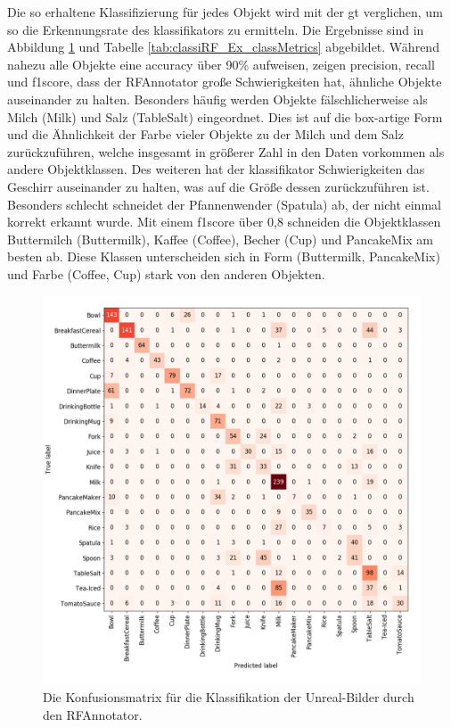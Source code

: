Die so erhaltene Klassifizierung für jedes Objekt wird mit der \gls{gt} verglichen, um so die Erkennungsrate des \gls{klassifikator}s zu ermitteln. Die Ergebnisse sind in Abbildung \ref{fig:classiRF_Ex_confMatrix} und Tabelle \ref{tab:classiRF_Ex_classMetrics} abgebildet. Während nahezu alle Objekte eine \gls{accuracy} über 90\% aufweisen, zeigen \gls{precision}, \gls{recall} und \gls{f1score}, dass der RFAnnotator große Schwierigkeiten hat, ähnliche Objekte auseinander zu halten. Besonders häufig werden Objekte fälschlicherweise als Milch (Milk) und Salz (TableSalt)  eingeordnet. Dies ist auf die box-artige Form und die Ähnlichkeit der Farbe vieler Objekte zu der Milch und dem Salz zurückzuführen, welche insgesamt in größerer Zahl in den Daten vorkommen als andere Objektklassen. Des weiteren hat der \gls{klassifikator} Schwierigkeiten das Geschirr auseinander zu halten, was auf die Größe dessen zurückzuführen ist. Besonders schlecht schneidet der Pfannenwender (Spatula) ab, der nicht einmal korrekt erkannt wurde. Mit einem \gls{f1score} über 0,8 schneiden die Objektklassen Buttermilch (Buttermilk), Kaffee (Coffee), Becher (Cup) und PancakeMix am besten ab. Diese Klassen unterscheiden sich in Form (Buttermilk, PancakeMix) und Farbe (Coffee, Cup) stark von den anderen Objekten.  

\begin{figure}
	\includegraphics[scale=.4]{img/chapter6/classifierRFconf_matrix.png}
\caption[Konfusionsmatrix der Klassifizierung durch den RFAnnotators]{Die Konfusionsmatrix für die Klassifikation der Unreal-Bilder durch den RFAnnotator.}
\label{fig:classiRF_Ex_confMatrix}
\end{figure}

